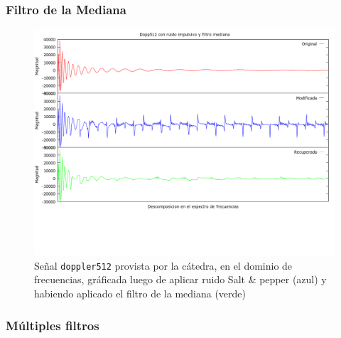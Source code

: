 \subsubsection{Filtro de la Mediana}

\begin{figure}[H]
\begin {center}
\includegraphics[width=500pt]{imagenes/dopp512-imp-median.png}
\end {center}
\caption{Se\~nal \texttt{doppler512} provista por la c\'atedra, en el dominio de frecuencias, gr\'aficada
luego de aplicar ruido Salt \& pepper (azul) y habiendo aplicado el filtro de la mediana (verde)}
\label{fig:SinProm}
\end{figure}


\subsubsection{M\'ultiples filtros}

